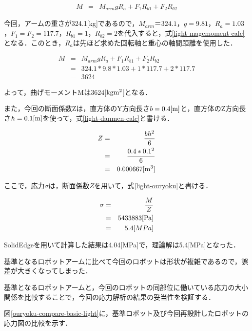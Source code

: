 \begin{eqnarray}
  M &=& M_{arm}g R_a + F_1 R_{b1} + F_2 R_{b2} 
  \label{light-magemoment}
\end{eqnarray}

今回，アームの重さが324.1{[}kg{]}であるので，\(M_{arm}＝324.1\)，\(g=9.81\)，\(R_a=1.03\)，\(F_1=F_2=117.7\)，\(R_{b1}=1\)，\(R_{b2}=2\)を代入すると，式\ref{light-magemoment-calc}となる．このとき，\(R_a\)は先ほど求めた回転軸と重心の軸間距離を使用した．

\begin{eqnarray}
  M &=& M_{arm}g R_a + F_1 R_{b1} + F_2 R_{b2}  \nonumber \\
    &=& 324.1*9.8*1.03 + 1*117.7+2*117.7 \nonumber \\
    &=& 3624
  \label{light-magemoment-calc}
\end{eqnarray}

よって，曲げモーメントMは3624{[}\(\rm kg m^2\){]}となる．

また，今回の断面係数Zは，直方体のY方向長さ\(b=0.4[\rm m]\)と，直方体のZ方向長さ\(h=0.1[\rm m]\)を使って，式\ref{light-danmen-calc}と書ける．

\begin{eqnarray}
  Z &=& \frac{bh^2}{6} \nonumber \\
    &=& \frac{0.4*0.1^2}{6} \nonumber \\
    &=& 0.000667 [\rm m^3]
  \label{light-danmen-calc}
\end{eqnarray}

ここで，応力\(\sigma\)は，断面係数\(Z\)を用いて，式\ref{light-ouryoku}と書ける．

\begin{eqnarray}
  \sigma &=& \frac{M}{Z} \nonumber \\
         &=& 5433883 [\rm Pa]\nonumber \\
         &=& 5.4 [MPa]
  \label{light-ouryoku}
\end{eqnarray}

SolidEdgeを用いて計算した結果は4.04{[}MPa{]}で，理論解は5.4{[}MPa{]}となった．

基準となるロボットアームに比べて今回のロボットは形状が複雑であるので，誤差が大きくなってしまった．

基準となるロボットアームと，今回のロボットの同部位に働いている応力の大小関係を比較することで，今回の応力解析の結果の妥当性を検証する．

図\ref{ouryoku-compare-basic-light}に，基準ロボット及び今回再設計したロボットの応力図の比較を示す．


